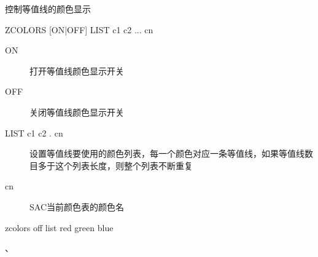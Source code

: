 \label{cmd:zcolors}

控制等值线的颜色显示

\begin{SACSTX}
ZCOLORS [ON|OFF] LIST c1 c2 ... cn
\end{SACSTX}

\begin{description}
\item [ON] 打开等值线颜色显示开关 
\item [OFF] 关闭等值线颜色显示开关 
\item [LIST c1 c2 . cn] 设置等值线要使用的颜色列表，每一个颜色对应一条等值线，如果等值线数目多于这个列表长度，则整个列表不断重复 
\item [cn]  SAC当前颜色表的颜色名 
\end{description}

\begin{SACDFT}
zcolors off list red green blue
\end{SACDFT}

、
